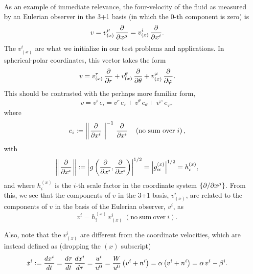 As an example of immediate relevance,
the four-velocity of the fluid as measured by an Eulerian observer
in the 3+1 basis (in which the 0-th component is zero) is
\begin{equation}
  v=v_{\left(x\right)}^{\mu}\,\frac{\partial}{\partial x^{\mu}}
  =v_{\left(x\right)}^{i}\,\frac{\partial}{\partial x^{i}}.
\end{equation}
The $v_{\left(x\right)}^{i}$
are what we initialize in our test problems and applications.
In spherical-polar coordinates, this vector takes the form
\begin{equation}
  v=v_{\left(x\right)}^{r}\,\frac{\partial}{\partial r}
  +v_{\left(x\right)}^{\theta}\,\frac{\partial}{\partial\theta}
  +v_{\left(x\right)}^{\varphi}\,\frac{\partial}{\partial\varphi}.
\end{equation}
This should be contrasted with the perhaps more familiar form,
\begin{equation}
  v=v^{i}\,e_{i}
  =v^{r}\,e_{r}+v^{\theta}\,e_{\theta}
  +v^{\varphi}\,e_{\varphi},
\end{equation}
where
\begin{equation}
  e_{i}:=\left|\left|\pd{}{x^{i}}\right|\right|^{-1}\,
  \pd{}{x^{i}}\hspace{1em}\left(\mathrm{no\ sum\ over\ }i\right),
\end{equation}
with
\begin{equation}
  \left|\left|\frac{\partial}{\partial x^{i}}\right|\right|
  :=\left|g\left(\frac{\partial}{\partial x^{i}},
  \frac{\partial}{\partial x^{i}}\right)\right|^{1/2}
  =\left|g^{\left(x\right)}_{ii}\right|^{1/2}=h^{\left(x\right)}_{i},
\end{equation}
and where $h^{\left(x\right)}_{i}$ is the $i$-th scale factor in the
coordinate system $\left\{\partial/\partial x^{\mu}\right\}$.
From this, we see that the components of $v$ in the 3+1 basis,
$v_{\left(x\right)}^{i}$,
are related to the components of $v$ in the basis of the Eulerian
observer, $v^{i}$, as
\begin{equation}
  v^{i}
  =h^{\left(x\right)}_{i}\,v_{\left(x\right)}^{i}
  \ \left(\mathrm{no\ sum\ over\ }i\right).
\end{equation}

Also, note that the $v_{\left(x\right)}^{i}$ are different from
the coordinate velocities,
which are instead defined as (dropping the $\left(x\right)$ subscript)
\begin{equation}
  \dot{x}^{i}:=\frac{dx^{i}}{dt}
  =\frac{d\tau}{dt}\,\frac{dx^{i}}{d\tau}
  =\frac{u^{i}}{u^{0}}
  =\frac{W}{u^{0}}\left(v^{i}+n^{i}\right)
  =\alpha\left(v^{i}+n^{i}\right)
  =\alpha\,v^{i}-\beta^{i}.
\end{equation}

